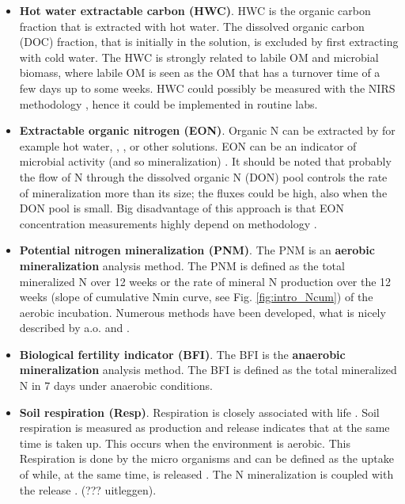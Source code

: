 \documentclass[10pt,twoside,dutch,english]{report}
\begin{document}
\begin{itemize}
	\item \textbf{Hot water extractable carbon (HWC)}. HWC is the organic carbon fraction that is extracted with hot water. The dissolved organic carbon (DOC) fraction, that is initially in the solution, is excluded by first extracting with cold water.  The HWC is strongly related to labile OM and microbial biomass\citep{Ghani2002, Ghani2003}, where labile OM is seen as the OM that has a turnover time of a few days up to some weeks. HWC could possibly be measured with the NIRS methodology \citep{Vasques2009}, hence it could be implemented in routine labs. 
	\item \textbf{Extractable organic nitrogen (EON)}. Organic N can be extracted by for example hot water, , ,  or other solutions. EON can be an indicator of microbial activity (and so mineralization) \citep{Schimel2004}. It should be noted that probably the flow of N through the dissolved organic N (DON) pool controls the rate of mineralization more than its size; the fluxes could be high, also when the DON pool is small. Big disadvantage of this approach is that EON concentration measurements highly depend on methodology \citep{Ros2009}. 
%
%
	
	\item \textbf{Potential nitrogen mineralization (PNM)}. The PNM is an \textbf{aerobic mineralization} analysis method. The PNM is defined as the total mineralized N over 12 weeks or the rate of mineral N production over the 12 weeks (slope of cumulative Nmin curve, see Fig. \ref{fig:intro_Ncum}) of the aerobic incubation. Numerous methods have been developed, what is nicely described by a.o. \citet{Doran1996} and \citet{Canali2005}.
	
	\item \textbf{Biological fertility indicator (BFI)}. The BFI is the \textbf{anaerobic mineralization} analysis method. The BFI is defined as the total mineralized N in 7 days under anaerobic conditions.
	
	\item \textbf{Soil respiration (Resp)}. Respiration is closely associated with life \citep{Bloem2005}. Soil respiration is measured as  production and  release indicates  that at the same time  is taken up. This occurs when the environment is aerobic. This Respiration is done by the micro organisms and can be defined as the uptake of  while, at the same time,  is released \citep{Bloem2005}. The N mineralization is coupled with the  release \citep{Geisseler2009}. (??? uitleggen). 
	

\end{itemize}
\end{document}
